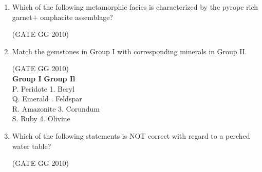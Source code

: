 \documentclass[journal]{IEEEtran}
\begin{document}
\begin{enumerate}[start=1]
\item Which of the following metamorphic facies is characterized by the pyrope rich garnet$+$ omphacite assemblage?

\hfill{(GATE GG 2010)}\\

\begin{enumerate}
\end{enumerate}
\item Match the gemstones in Group I with corresponding minerals in Group II.

\hfill{(GATE GG 2010)}\\

\vspace{0cm}
\textbf{Group I} \hspace{3cm}
\textbf{Group Il}\\
P. Peridote \qquad \qquad \qquad \qquad\hspace{0.13cm}1. Beryl\\
Q. Emerald \qquad \qquad \qquad {}. Feldspar\\
R. Amazonite \qquad \qquad \quad \qquad \hspace{0.05cm}3. Corundum\\
S. Ruby \qquad \qquad \qquad \qquad \hspace{0.4cm} 4. Olivine\\
\begin{enumerate}
\end{enumerate}

\item Which of the following statements is NOT correct with regard to a perched water table?

\hfill{(GATE GG 2010)}\\


\end{enumerate}
\end{document}

